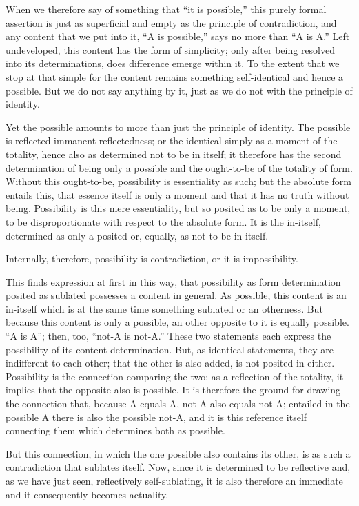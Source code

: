 When we therefore say of something
that “it is possible,”
this purely formal assertion is
just as superficial and empty
as the principle of contradiction,
and any content that we put into it,
“A is possible,” says no more than “A is A.”
Left undeveloped, this content has
the form of simplicity;
only after being resolved
into its determinations,
does difference emerge within it.
To the extent that we stop at that
simple for the content remains
something self-identical
and hence a possible.
But we do not say anything by it,
just as we do not with the principle of identity.

Yet the possible amounts to more
than just the principle of identity.
The possible is reflected immanent reflectedness;
or the identical simply as a moment of the totality,
hence also as determined not to be in itself;
it therefore has the second determination of being only a possible
and the ought-to-be of the totality of form.
Without this ought-to-be, possibility is essentiality as such;
but the absolute form entails this,
that essence itself is only a moment
and that it has no truth without being.
Possibility is this mere essentiality,
but so posited as to be only a moment,
to be disproportionate with respect to the absolute form.
It is the in-itself, determined as only a posited
or, equally, as not to be in itself.

Internally, therefore, possibility is contradiction,
or it is impossibility.

This finds expression at first in this way,
that possibility as form determination
posited as sublated possesses a content in general.
As possible, this content is an in-itself
which is at the same time something sublated
or an otherness.
But because this content is only a possible,
an other opposite to it is equally possible.
“A is A”; then, too, “not-A is not-A.”
These two statements each express
the possibility of its content determination.
But, as identical statements,
they are indifferent to each other;
that the other is also added,
is not posited in either.
Possibility is the connection comparing the two;
as a reflection of the totality,
it implies that the opposite also is possible.
It is therefore the ground for drawing the connection that,
because A equals A, not-A also equals not-A;
entailed in the possible A there is also the possible not-A,
and it is this reference itself connecting them
which determines both as possible.

But this connection, in which
the one possible also contains its other,
is as such a contradiction that sublates itself.
Now, since it is determined to be reflective
and, as we have just seen, reflectively self-sublating,
it is also therefore an immediate
and it consequently becomes actuality.

